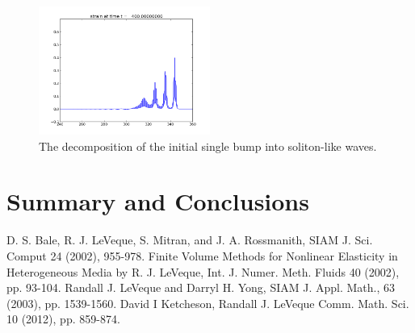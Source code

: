 \documentclass{article}
\begin{document}
\begin{figure}
  \includegraphics[width=0.5\textwidth]{frame0040fig1.png}
  \caption{The decomposition of the initial single bump into soliton-like waves.}
  \label{travelw}
\end{figure}


\section{Summary and Conclusions}




\begin{thebibliography}{9}
D. S. Bale, R. J. LeVeque, S. Mitran, and J. A. Rossmanith, SIAM J. Sci. Comput 24 (2002), 955-978.
Finite Volume Methods for Nonlinear Elasticity in Heterogeneous Media
by R. J. LeVeque, Int. J. Numer. Meth. Fluids 40 (2002), pp. 93-104.
Randall J. LeVeque and Darryl H. Yong, SIAM J. Appl. Math., 63 (2003), pp. 1539-1560.
David I Ketcheson, Randall J. LeVeque Comm. Math. Sci. 10 (2012), pp. 859-874.

\end{thebibliography}
\end{document}
